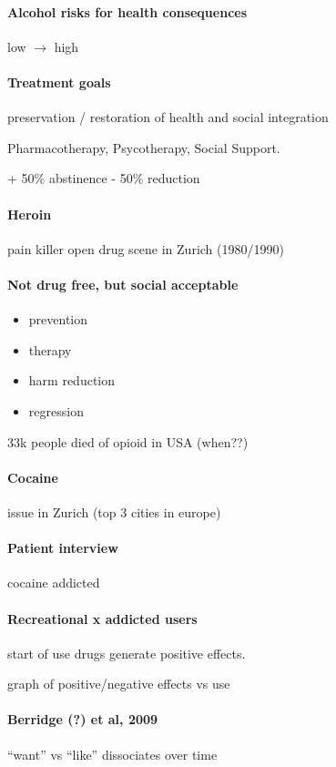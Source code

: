 \documentclass[12pt,article,oneside,a4paper]{memoir}
\begin{document}
\paragraph{Alcohol risks for health consequences} low $\rightarrow$ high
\paragraph{Treatment goals} preservation / restoration of health and social integration

Pharmacotherapy, Psycotherapy, Social Support.

+ 50\% abstinence
- 50\% reduction

\paragraph{Heroin} pain killer
open drug scene in Zurich (1980/1990)

\paragraph{Not drug free, but social acceptable}
\begin{itemize}
\item prevention
\item therapy
\item harm reduction
\item regression
\end{itemize}

33k people died of opioid in USA (when??)

\paragraph{Cocaine} issue in Zurich (top 3 cities in europe)
\paragraph{Patient interview} cocaine addicted

\paragraph{Recreational x addicted users} start of use drugs generate positive effects.

graph of positive/negative effects vs use

\paragraph{Berridge (?) et al, 2009} ``want'' vs ``like'' dissociates over time
\end{document}
